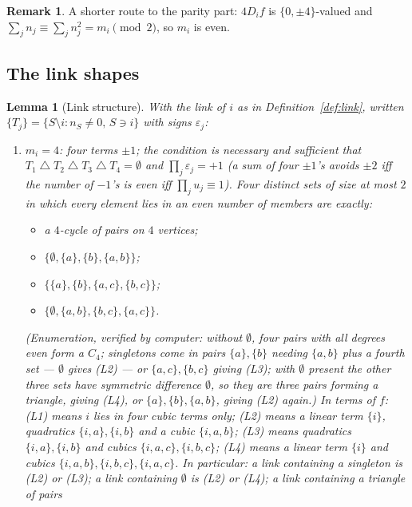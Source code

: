 \documentclass[11pt,reqno]{amsart}
\theoremstyle{plain}
\newtheorem{lemma}[theorem]{Lemma}
\theoremstyle{definition}
\newtheorem{remark}[theorem]{Remark}
\numberwithin{theorem}{section}
\newcommand{\sd}{\mathbin{\triangle}}
\newcommand{\eps}{\varepsilon}
\begin{document}
\begin{remark}
A shorter route to the parity part: $4D_i f$ is $\{0,\pm4\}$-valued and
$\sum_j n_j \equiv \sum_j n_j^2 = m_i \pmod 2$, so $m_i$ is even.
\end{remark}

\subsection{The link shapes}

\begin{lemma}[Link structure]\label{lem:links}
With the link of $i$ as in Definition~\ref{def:link}, written
$\{T_j\} = \{S \setminus i : n_S \ne 0,\, S \ni i\}$ with signs $\eps_j$:
\begin{enumerate}[label=\textup{(\alph*)}]
  \item \textbf{$m_i = 4$}: four terms $\pm1$; the condition is necessary and sufficient that
  $T_1 \sd T_2 \sd T_3 \sd T_4 = \emptyset$ and $\prod_j \eps_j = +1$ (a sum of four $\pm1$'s
  avoids $\pm2$ iff the number of $-1$'s is even iff $\prod_j u_j \equiv 1$). Four distinct
  sets of size at most $2$ in which every element lies in an even number of members are exactly:
  \begin{itemize}[leftmargin=1.4em]
    \item[(L1)] a $4$-cycle of pairs on $4$ vertices;
    \item[(L2)] $\{\emptyset, \{a\}, \{b\}, \{a,b\}\}$;
    \item[(L3)] $\{\{a\}, \{b\}, \{a,c\}, \{b,c\}\}$;
    \item[(L4)] $\{\emptyset, \{a,b\}, \{b,c\}, \{a,c\}\}$.
  \end{itemize}
  (Enumeration, verified by computer: without $\emptyset$, four pairs with all degrees even form
  a $C_4$; singletons come in pairs $\{a\},\{b\}$ needing $\{a,b\}$ plus a fourth set ---
  $\emptyset$ gives (L2) --- or $\{a,c\},\{b,c\}$ giving (L3); with $\emptyset$ present the other
  three sets have symmetric difference $\emptyset$, so they are three pairs forming a triangle,
  giving (L4), or $\{a\},\{b\},\{a,b\}$, giving (L2) again.)
  In terms of $f$: (L1) means $i$ lies in four cubic terms only; (L2) means a linear term
  $\{i\}$, quadratics $\{i,a\},\{i,b\}$ and a cubic $\{i,a,b\}$; (L3) means quadratics
  $\{i,a\},\{i,b\}$ and cubics $\{i,a,c\},\{i,b,c\}$; (L4) means a linear term $\{i\}$ and
  cubics $\{i,a,b\},\{i,b,c\},\{i,a,c\}$. In particular: a link containing a singleton is (L2)
  or (L3); a link containing $\emptyset$ is (L2) or (L4); a link containing a triangle of pairs

\end{enumerate}
\end{lemma}
\end{document}
